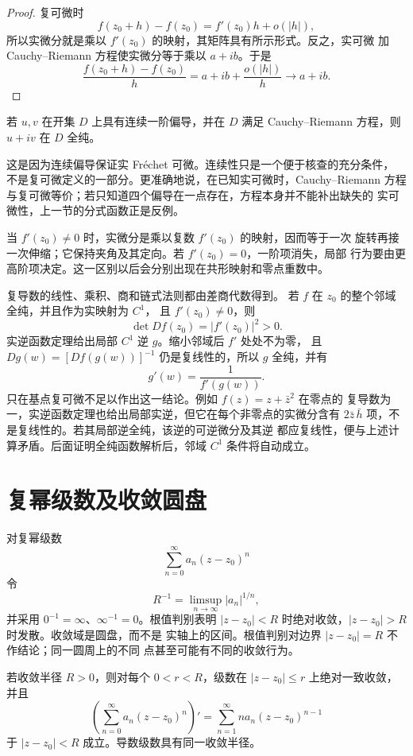 \begin{proof}
复可微时
\[
 f(z_0+h)-f(z_0)=f'(z_0)h+o(|h|),
\]
所以实微分就是乘以 \(f'(z_0)\) 的映射，其矩阵具有所示形式。反之，实可微
加 Cauchy--Riemann 方程使实微分等于乘以 \(a+ib\)。于是
\[
 \frac{f(z_0+h)-f(z_0)}h
 =a+ib+\frac{o(|h|)}h\longrightarrow a+ib.
\]
\end{proof}

\begin{corollary}[连续偏导判据]
\label{cor:continuous-cr-holomorphic}
若 \(u,v\) 在开集 \(D\) 上具有连续一阶偏导，并在 \(D\) 满足
Cauchy--Riemann 方程，则 \(u+iv\) 在 \(D\) 全纯。
\end{corollary}

这是因为连续偏导保证实 Fréchet 可微。连续性只是一个便于核查的充分条件，
不是复可微定义的一部分。更准确地说，在已知实可微时，Cauchy--Riemann
方程与复可微等价；若只知道四个偏导在一点存在，方程本身并不能补出缺失的
实可微性，上一节的分式函数正是反例。

当 \(f'(z_0)\ne0\) 时，实微分是乘以复数 \(f'(z_0)\) 的映射，因而等于一次
旋转再接一次伸缩；它保持夹角及其定向。若 \(f'(z_0)=0\)，一阶项消失，局部
行为要由更高阶项决定。这一区别以后会分别出现在共形映射和零点重数中。

复导数的线性、乘积、商和链式法则都由差商代数得到。
若 \(f\) 在 \(z_0\) 的整个邻域全纯，并且作为实映射为 \(C^1\)，
且 \(f'(z_0)\ne0\)，则
\[
 \det Df(z_0)=|f'(z_0)|^2>0.
\]
实逆函数定理给出局部 \(C^1\) 逆 \(g\)。缩小邻域后 \(f'\) 处处不为零，
且 \(Dg(w)=[Df(g(w))]^{-1}\) 仍是复线性的，所以 \(g\) 全纯，并有
\[
 g'(w)=\frac1{f'(g(w))}.
\]
只在基点复可微不足以作出这一结论。例如 \(f(z)=z+\bar z^2\) 在零点的
复导数为一，实逆函数定理也给出局部实逆，但它在每个非零点的实微分含有
\(2\bar z\,\bar h\) 项，不是复线性的。若其局部逆全纯，该逆的可逆微分及其逆
都应复线性，便与上述计算矛盾。后面证明全纯函数解析后，邻域 \(C^1\)
条件将自动成立。

\section{复幂级数及收敛圆盘}

对复幂级数
\[
 \sum_{n=0}^{\infty}a_n(z-z_0)^n
\]
令
\[
 R^{-1}=\limsup_{n\to\infty}|a_n|^{1/n},
\]
并采用 \(0^{-1}=\infty\)、\(\infty^{-1}=0\)。根值判别表明
\(|z-z_0|<R\) 时绝对收敛，\(|z-z_0|>R\) 时发散。收敛域是圆盘，而不是
实轴上的区间。根值判别对边界 \(|z-z_0|=R\) 不作结论；同一圆周上的不同
点甚至可能有不同的收敛行为。

\begin{theorem}[复幂级数的逐项求导]
\label{thm:complex-power-series-calculus}
若收敛半径 \(R>0\)，则对每个 \(0<r<R\)，级数在
\(|z-z_0|\le r\) 上绝对一致收敛，并且
\[
 \left(\sum_{n=0}^{\infty}a_n(z-z_0)^n\right)'
 =\sum_{n=1}^{\infty}na_n(z-z_0)^{n-1}
\]
于 \(|z-z_0|<R\) 成立。导数级数具有同一收敛半径。
\end{theorem}

